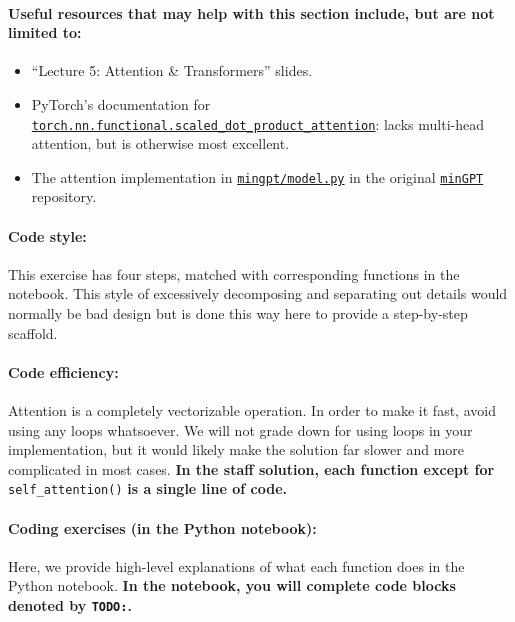 \documentclass{article}
\begin{document}
\paragraph{Useful resources that may help with this section include, but are not limited to:}

\begin{itemize}
    \item ``Lecture 5: Attention \& Transformers'' slides.
    \item PyTorch's documentation for
    \href{https://pytorch.org/docs/stable/generated/torch.nn.functional.scaled_dot_product_attention}{\texttt{torch.nn.functional.scaled\_dot\_product\_attention}}:
    lacks multi-head attention, but is otherwise most excellent.
    \item The attention implementation in
    \href{https://github.com/karpathy/minGPT/blob/master/mingpt/model.py#L29}{\texttt{mingpt/model.py}}
    in the original \href{https://github.com/karpathy/minGPT}{\texttt{minGPT}}
    repository.
\end{itemize}

\paragraph{Code style:} This exercise has four steps, matched with corresponding
functions in the notebook. This style of excessively decomposing and separating
out details would normally be bad design but is done this way here to provide a
step-by-step scaffold. 

\paragraph{Code efficiency:}
Attention is a completely vectorizable operation. In order to make it fast,
avoid using any loops whatsoever. We will not grade down for using loops in your
implementation, but it would likely make the solution far slower and more
complicated in most cases. \textbf{In the staff solution, each function except
for} \verb|self_attention()| \textbf{is a single line of code.}


\paragraph{Coding exercises (in the Python notebook):}

    Here, we provide high-level explanations of what each function does in the
    Python notebook. \textbf{In the notebook, you will complete code blocks
    denoted by \texttt{TODO:}.}
\end{document}
